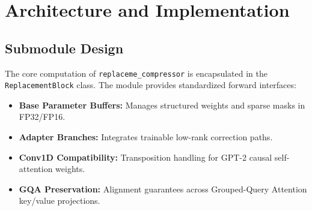 \section{Architecture and Implementation}

\subsection{Submodule Design}
The core computation of \texttt{replaceme_compressor} is encapsulated in the \texttt{ReplacementBlock} class. The module provides standardized forward interfaces:
\begin{itemize}
\item \textbf{Base Parameter Buffers:} Manages structured weights and sparse masks in FP32/FP16.
\item \textbf{Adapter Branches:} Integrates trainable low-rank correction paths.
\item \textbf{Conv1D Compatibility:} Transposition handling for GPT-2 causal self-attention weights.
\item \textbf{GQA Preservation:} Alignment guarantees across Grouped-Query Attention key/value projections.
\end{itemize}
